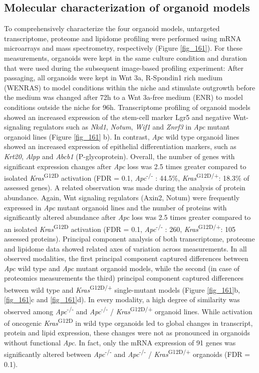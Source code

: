 \begin{flushleft}
\subsection{Molecular characterization of organoid models}
To comprehensively characterize the four organoid models, untargeted transcriptome, proteome and lipidome profiling were performed using mRNA microarrays and mass spectrometry, respectively (Figure \ref{fig_161}). For these measurements, organoids were kept in the same culture condition and duration that were used during the subsequent image-based profiling experiment: After passaging, all organoids were kept in Wnt 3a, R-Spondin1 rich medium (WENRAS) to model conditions within the niche and stimulate outgrowth before the medium was changed after 72h to a Wnt 3a-free medium (ENR) to model conditions outside the niche for 96h. Transcriptome profiling of organoid models showed an increased expression of the stem-cell marker Lgr5 and negative Wnt-signaling regulators such as \textit{Nkd1}, \textit{Notum}, \textit{Wif1} and \textit{Znrf3} in \textit{Apc} mutant organoid lines (Figure \ref{fig_161} b). In contrast, \textit{Apc} wild type organoid lines showed an increased expression of epithelial differentiation markers, such as \textit{Krt20}, \textit{Alpp} and \textit{Abcb1} (P-glycoprotein). Overall, the number of genes with significant expression changes after \textit{Apc} loss was 2.5 times greater compared to isolated \textit{Kras}\textsuperscript{G12D} activation (FDR = 0.1, \textit{Apc}\textsuperscript{-/-} : 44.5\%, \textit{Kras}\textsuperscript{G12D/+}: 18.3\% of assessed genes). A related observation was made during the analysis of protein abundance. Again, Wnt signaling regulators (Axin2, Notum) were frequently expressed in \textit{Apc} mutant organoid lines and the number of proteins with significantly altered abundance after \textit{Apc} loss was 2.5 times greater compared to an isolated \textit{Kras}\textsuperscript{G12D} activation (FDR = 0.1, \textit{Apc}\textsuperscript{-/-} : 260, \textit{Kras}\textsuperscript{G12D/+}: 105 assessed proteins). Principal component analysis of both transcriptome, proteome and lipidome data showed related axes of variation across measurements. In all observed modalities, the first principal component captured differences between \textit{Apc} wild type and \textit{Apc} mutant organoid models, while the second (in case of proteomics measurements the third) principal component captured differences between wild type and \textit{Kras}\textsuperscript{G12D/+} single-mutant models (Figure \ref{fig_161}b, \ref{fig_161}c and \ref{fig_161}d). In every modality, a high degree of similarity was observed among \textit{Apc}\textsuperscript{-/-}  and \textit{Apc}\textsuperscript{-/-} / \textit{Kras}\textsuperscript{G12D/+} organoid lines. While activation of oncogenic \textit{Kras}\textsuperscript{G12D} in wild type organoids led to global changes in transcript, protein and lipid expression, these changes were not as pronounced in organoids without functional \textit{Apc}. In fact, only the mRNA expression of 91 genes was significantly altered between \textit{Apc}\textsuperscript{-/-}  and \textit{Apc}\textsuperscript{-/-} / \textit{Kras}\textsuperscript{G12D/+} organoids (FDR = 0.1). 


\end{flushleft}
